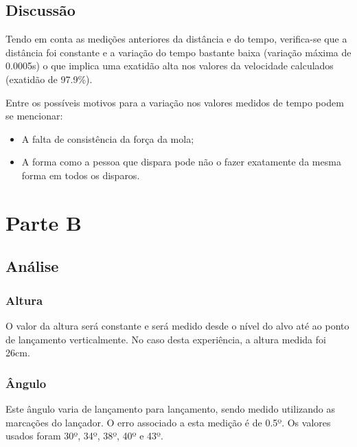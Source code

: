 {\subsection{Discussão}
\label{subsec:analise-discussao-parte1-discussao}

Tendo em conta as medições anteriores da distância e do tempo, verifica-se que a distância foi constante e a variação do tempo bastante baixa (variação máxima de 0.0005s) o que implica uma exatidão alta nos valores da velocidade calculados (exatidão de 97.9\%).\bigskip

Entre os possíveis motivos para a variação nos valores medidos de tempo podem se mencionar:
\begin{itemize}
    \item A falta de consistência da força da mola;
    \item A forma como a pessoa que dispara pode não o fazer exatamente da mesma forma em todos os disparos.
\end{itemize}

\pagebreak

\section{Parte B}
\label{sec:analise-discussao-parte2}

\subsection{Análise}
\label{subsec:analise-discussao-parte2-analise}

\subsubsection{Altura}
\label{subsec:analise-discussao-parte2-altura}

O valor da altura será constante e será medido desde o nível do alvo até ao ponto de lançamento verticalmente. No caso desta experiência, a altura medida foi 26cm.

\subsubsection{Ângulo}
\label{subsec:analise-discussao-parte2-angulo}

Este ângulo varia de lançamento para lançamento, sendo medido utilizando as marcações do lançador. O erro associado a esta medição é de 0.5º. Os valores usados foram 30º, 34º, 38º, 40º e 43º.

}
